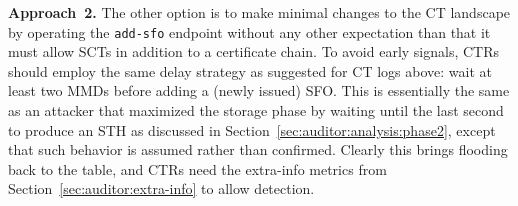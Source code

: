 \textbf{Approach~2.}  The other option is to make minimal changes to the CT
landscape by operating the \texttt{add-sfo} endpoint without any other
expectation than that it must allow SCTs in addition to a certificate chain. To
avoid early signals, CTRs should employ the same delay strategy as suggested for
CT logs above: wait at least two MMDs before adding a (newly issued) SFO. This
is essentially the same as an attacker that maximized the storage phase by
waiting until the last second to produce an STH as discussed in
Section~\ref{sec:auditor:analysis:phase2}, except that such behavior is assumed
rather than confirmed.  Clearly this brings flooding back to the table, and CTRs
need the extra-info metrics from Section~\ref{sec:auditor:extra-info} to allow
detection.
